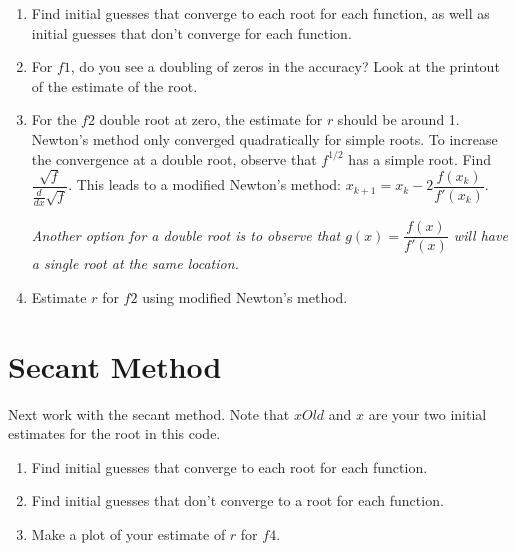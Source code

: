 \documentclass[12pt,letterpaper,noanswers]{exam}
\begin{document}
\begin{enumerate}[resume=classQ]
\item Find initial guesses that converge to each root for each function, as well as initial guesses that don't converge for each function.

\vfill

\item For $f1$, do you see a doubling of zeros in the accuracy? Look at the printout of the estimate of the root.

\vfill

\pagebreak
\item For the $f2$ double root at zero, the estimate for $r$ should be around 1.  Newton's method only converged quadratically for simple roots.  To increase the convergence at a double root, observe that $f^{1/2}$ has a simple root.  Find $\dfrac{\sqrt{f}}{\frac{d}{dx}\sqrt{f}}$.  This leads to a modified Newton's method: $x_{k+1} = x_k - 2\dfrac{f(x_k)}{f'(x_k)}$.  

\emph{Another option for a double root is to observe that $g(x) = \dfrac{f(x)}{f'(x)}$ will have a single root at the same location.}

\vfill

\item Estimate $r$ for $f2$ using modified Newton's method.


\end{enumerate}








\section*{Secant Method}

\noindent
Next work with the secant method.  Note that $xOld$ and $x$ are your two initial estimates for the root in this code.

\begin{enumerate}[resume=classQ]
\item Find initial guesses that converge to each root for each function.

\vfill

\item Find initial guesses that don't converge to a root for each function.

\vfill

\item Make a plot of your estimate of $r$ for $f4$.

\vfill

\end{enumerate}
\end{document}
